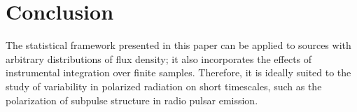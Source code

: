 \documentclass[twocolumn]{aastex6}
\begin{document}

\section{Conclusion}
\label{sec:discussion}

The statistical framework presented in this paper can be applied to
sources with arbitrary distributions of flux density; it also
incorporates the effects of instrumental integration over finite
samples.  Therefore, it is ideally suited to the study of
variability in polarized radiation on short timescales, such as the
polarization of subpulse structure in radio pulsar
emission.
\end{document}
